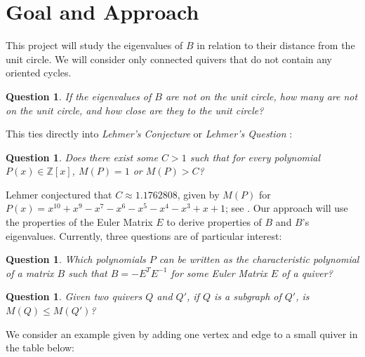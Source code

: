 \documentclass{amsart}
\theoremstyle{theorem}
\theoremstyle{theorem*}
\newtheorem{question}[theorem]{Question}
\theoremstyle{definition}
\begin{document}
\section*{Goal and Approach}

This project will study the eigenvalues of $B$ in relation to their distance
from the unit circle. We will consider only connected quivers that do not
contain any oriented cycles.

\begin{question}
    If the eigenvalues of $B$ are not on the unit circle, how many are not on
    the unit circle, and how close are they to the unit circle?
\end{question}

This ties directly into \textit{Lehmer's Conjecture} or \textit{Lehmer's
    Question} \cite{m}:

\begin{question} Does there exist some $C > 1$ such that for every polynomial
    $P(x) \in \mathbb{Z}[x]$, $M(P) = 1$ or $M(P) > C$?
\end{question}
Lehmer conjectured that $C \approx 1.1762808$, given by $M(P)$ for $P(x) =
    x^{10} + x^9 - x^7 - x^6 - x^5 - x^4 - x^3 + x + 1$; see \cite{m}. Our approach
will use the properties of the Euler Matrix $E$ to derive properties of $B$ and $B$'s
eigenvalues. Currently, three questions are of particular interest:

\begin{question}
    Which polynomials $P$ can be written as the characteristic polynomial of a
    matrix $B$ such that $B = - E^T E^{-1}$ for some Euler Matrix $E$ of a
    quiver?
\end{question}

\begin{question}
    Given two quivers $Q$ and $Q'$, if $Q$ is a subgraph of $Q'$, is $M(Q) \leq
        M(Q')$?
\end{question}

We consider an example given by adding one vertex and edge to a small quiver in the
table below:
\end{document}
